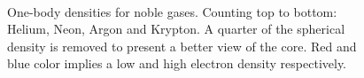 \begin{figure}
\begin{center}
     \\
  \caption{One-body densities for noble gases. Counting top to bottom: Helium, Neon, Argon and Krypton. A quarter of the spherical density is removed to present a better view of the core. Red and blue color implies a low and high electron density respectively.}
  \label{fig:OBD_noble_Atoms_2D_combo}
 \end{center}
\end{figure}
 
 

